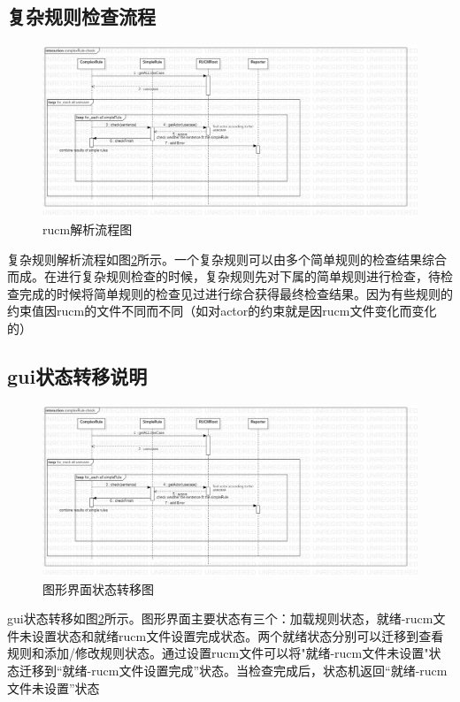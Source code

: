 \subsection{复杂规则检查流程}
	\begin{figure}
	\centering
	\includegraphics[width=1\textwidth]{./src/sequence_complexCheck.jpg} 
	\caption{rucm解析流程图} 
	\label{sequence_complexCheck}
	\end{figure}
	复杂规则解析流程如图\ref{sequence_complexCheck}所示。一个复杂规则可以由多个简单规则的检查结果综合而成。在进行复杂规则检查的时候，复杂规则先对下属的简单规则进行检查，待检查完成的时候将简单规则的检查见过进行综合获得最终检查结果。因为有些规则的约束值因rucm的文件不同而不同（如对actor的约束就是因rucm文件变化而变化的）

\subsection{gui状态转移说明}
	\begin{figure}
	\centering
	\includegraphics[width=1\textwidth]{./src/sequence_complexCheck.jpg} 
	\caption{图形界面状态转移图} 
	\label{sequence_complexCheck}
	\end{figure}
	gui状态转移如图\ref{sequence_complexCheck}所示。图形界面主要状态有三个：加载规则状态，就绪-rucm文件未设置状态和就绪rucm文件设置完成状态。两个就绪状态分别可以迁移到查看规则和添加/修改规则状态。通过设置rucm文件可以将"就绪-rucm文件未设置"状态迁移到“就绪-rucm文件设置完成”状态。当检查完成后，状态机返回“就绪-rucm文件未设置”状态
	
	
	
	